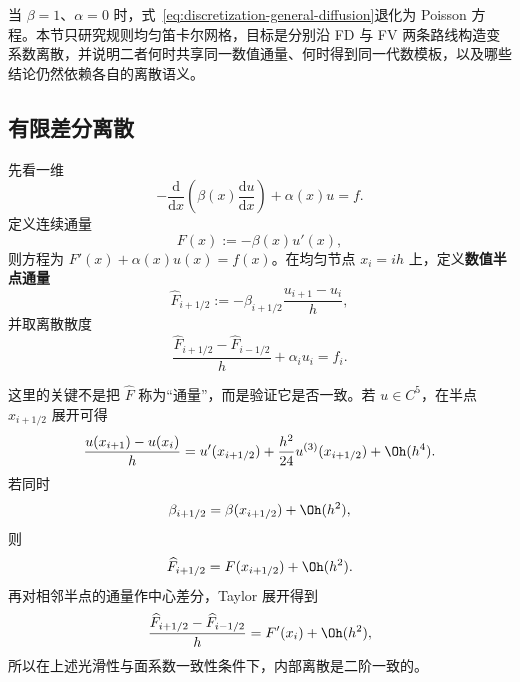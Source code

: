当 $\beta=1$、$\alpha=0$ 时，式~\eqref{eq:discretization-general-diffusion}退化为 Poisson 方程。本节只研究规则均匀笛卡尔网格，目标是分别沿 FD 与 FV 两条路线构造变系数离散，并说明二者何时共享同一数值通量、何时得到同一代数模板，以及哪些结论仍然依赖各自的离散语义。

\subsection{有限差分离散}

先看一维
\begin{equation}
-\frac{\mathrm d}{\mathrm dx}
\left(\beta(x)\frac{\mathrm du}{\mathrm dx}\right)
+\alpha(x)u
=f.
\label{eq:discretization-general-diffusion-one-dimensional}
\end{equation}
定义连续通量
\begin{equation}
F(x):=-\beta(x)u'(x),
\end{equation}
则方程为 $F'(x)+\alpha(x)u(x)=f(x)$。在均匀节点 $x_i=ih$ 上，定义\textbf{数值半点通量}
\begin{equation}
\widehat F_{i+1/2}
:=-\beta_{i+1/2}\frac{u_{i+1}-u_i}{h},
\label{eq:discretization-fd-variable-face-flux}
\end{equation}
并取离散散度
\begin{equation}
\frac{\widehat F_{i+1/2}-\widehat F_{i-1/2}}{h}
+\alpha_i u_i
=f_i.
\label{eq:discretization-fd-variable-divergence}
\end{equation}

这里的关键不是把 $\widehat F$ 称为“通量”，而是验证它是否一致。若 $u\in C^5$，在半点 $x_{i+1/2}$ 展开可得
\begin{equation}
\frac{u(x_{i+1})-u(x_i)}{h}
=u'(x_{i+1/2})
+\frac{h^2}{24}u^{(3)}(x_{i+1/2})
+\Oh(h^4).
\label{eq:discretization-centered-first-derivative-midpoint}
\end{equation}
若同时
\begin{equation}
\beta_{i+1/2}
=\beta(x_{i+1/2})+\Oh(h^2),
\label{eq:discretization-face-beta-consistency}
\end{equation}
则
\begin{equation}
\widehat F_{i+1/2}
=F(x_{i+1/2})+\Oh(h^2).
\end{equation}
再对相邻半点的通量作中心差分，Taylor 展开得到
\begin{equation}
\frac{\widehat F_{i+1/2}-\widehat F_{i-1/2}}{h}
=F'(x_i)+\Oh(h^2),
\end{equation}
所以在上述光滑性与面系数一致性条件下，内部离散是二阶一致的。

